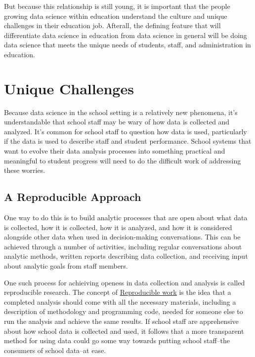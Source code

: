 \documentclass[]{book}
\begin{document}
But because this relationship is still young, it is important that the
people growing data science within education understand the culture and
unique challenges in their education job. Afterall, the defining feature
that will differentiate data science in education from data science in
general will be doing data science that meets the unique needs of
students, staff, and administration in education.

\chapter{Unique Challenges}\label{unique-challenges}

Because data science in the school setting is a relatively new
phenomena, it's understandable that school staff may be wary of how data
is collected and analyzed. It's common for school staff to question how
data is used, particularly if the data is used to describe staff and
student performance. School systems that want to evolve their data
analysis processes into something practical and meaningful to student
progress will need to do the difficult work of addressing these worries.

\section{A Reproducible Approach}\label{a-reproducible-approach}

One way to do this is to build analytic processes that are open about
what data is collected, how it is collected, how it is analyzed, and how
it is considered alongside other data when used in decision-making
conversations. This can be achieved through a number of activities,
including regular conversations about analytic methods, written reports
describing data collection, and receiving input about analytic goals
from staff members.

One such process for achieiving openess in data collection and analysis
is called reproducible research. The concept of
\href{\%22https://en.wikipedia.org/wiki/Reproducibility\#Reproducible_research\%22}{Reproducible
work} is the idea that a completed analysis should come with all the
necessary materials, including a description of methodology and
programming code, needed for someone else to run the analysis and
achieve the same results. If school staff are apprehensive about how
school data is collected and used, it follows that a more transparent
method for using data could go some way towards putting school
staff--the consumers of school data--at ease.
\end{document}
